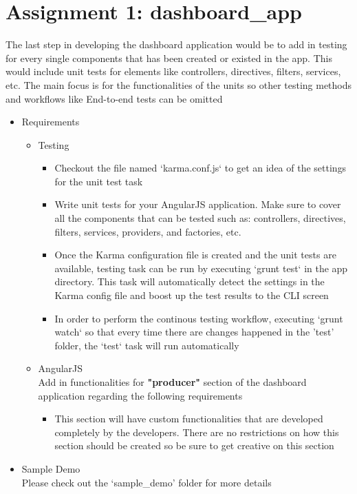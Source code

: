 \documentclass[12pt]{article}
\begin{document}
\section{Assignment 1: dashboard\_app}
The last step in developing the dashboard application would be to add in testing for every single components that has been created or existed in the app. This would include unit tests for elements like controllers, directives, filters, services, etc. The main focus is for the functionalities of the units so other testing methods and workflows like End-to-end tests can be omitted
\begin{itemize}
	\item Requirements	
		\begin{itemize}
		\item Testing
			\begin{itemize}
				\item Checkout the file named `karma.conf.js` to get an idea of the settings for the unit test task
				\item Write unit tests for your AngularJS application. Make sure to cover all the components that can be tested such as: controllers, directives, filters, services, providers, and factories, etc.
				\item Once the Karma configuration file is created and the unit tests are available, testing task can be run by executing `grunt test` in the app directory. This task will automatically detect the settings in the Karma config file and boost up the test results to the CLI screen
				\item In order to perform the continous testing workflow, executing `grunt watch` so that every time there are changes happened in the 'test' folder, the `test` task will run automatically 
			\end{itemize}			
		\item AngularJS\\
		Add in functionalities for \textbf{"producer"} section of the dashboard application regarding the following requirements
			\begin{itemize}
				\item This section will have custom functionalities that are developed completely by the developers. There are no restrictions on how this section should be created so be sure to get creative on this section
			\end{itemize}
		\end{itemize}
	\item Sample Demo\\
	Please check out the `sample\_demo' folder for more details 
\end{itemize}
\end{document}
